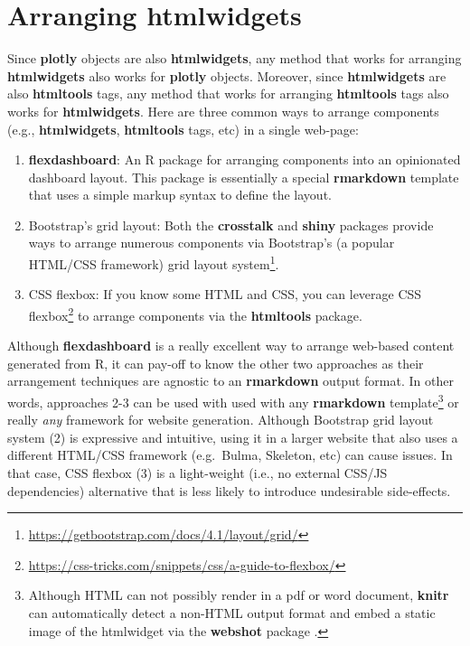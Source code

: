 \documentclass[
  12pt,
]{krantz}
\providecommand{\tightlist}{%
  \setlength{\itemsep}{0pt}\setlength{\parskip}{0pt}}
\renewcommand{\href}[2]{#2\footnote{\url{#1}}}
\begin{document}
\hypertarget{arranging-htmlwidgets}{%
\section{Arranging htmlwidgets}\label{arranging-htmlwidgets}}

Since \textbf{plotly} objects are also \textbf{htmlwidgets}, any method that works for arranging \textbf{htmlwidgets} also works for \textbf{plotly} objects. Moreover, since \textbf{htmlwidgets} are also \textbf{htmltools} tags, any method that works for arranging \textbf{htmltools} tags also works for \textbf{htmlwidgets}. Here are three common ways to arrange components (e.g., \textbf{htmlwidgets}, \textbf{htmltools} tags, etc) in a single web-page:

\begin{enumerate}
\def\labelenumi{\arabic{enumi}.}
\tightlist
\item
  \textbf{flexdashboard}: An R package for arranging components into an opinionated dashboard layout. This package is essentially a special \textbf{rmarkdown} template that uses a simple markup syntax to define the layout.
\item
  Bootstrap's grid layout: Both the \textbf{crosstalk} and \textbf{shiny} packages provide ways to arrange numerous components via Bootstrap's (a popular HTML/CSS framework) \href{https://getbootstrap.com/docs/4.1/layout/grid/}{grid layout system}.
\item
  CSS flexbox: If you know some HTML and CSS, you can leverage \href{https://css-tricks.com/snippets/css/a-guide-to-flexbox/}{CSS flexbox} to arrange components via the \textbf{htmltools} package.
\end{enumerate}

Although \textbf{flexdashboard} is a really excellent way to arrange web-based content generated from R, it can pay-off to know the other two approaches as their arrangement techniques are agnostic to an \textbf{rmarkdown} output format. In other words, approaches 2-3 can be used with used with any \textbf{rmarkdown} template\footnote{Although HTML can not possibly render in a pdf or word document, \textbf{knitr} can automatically detect a non-HTML output format and embed a static image of the htmlwidget via the \textbf{webshot} package \citep{webshot}.} or really \emph{any} framework for website generation. Although Bootstrap grid layout system (2) is expressive and intuitive, using it in a larger website that also uses a different HTML/CSS framework (e.g.~Bulma, Skeleton, etc) can cause issues. In that case, CSS flexbox (3) is a light-weight (i.e., no external CSS/JS dependencies) alternative that is less likely to introduce undesirable side-effects.
\end{document}
